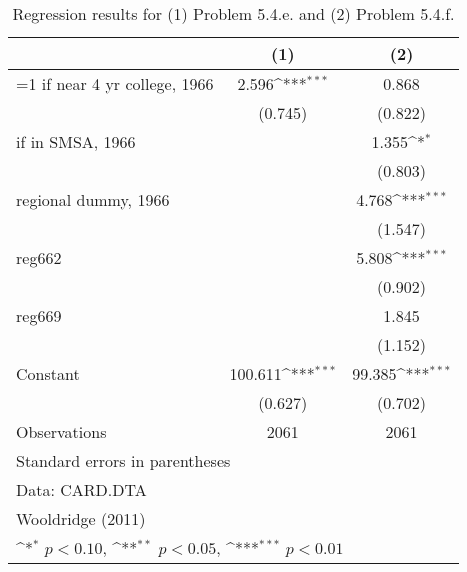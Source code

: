 \begin{table}[htbp]\centering
\def\sym#1{\ifmmode^{#1}\else\(^{#1}\)\fi}
\caption{Regression results for (1) Problem 5.4.e. and (2) Problem 5.4.f.}
\begin{tabular}{l*{2}{c}}
\toprule
                    &\multicolumn{1}{c}{(1)}         &\multicolumn{1}{c}{(2)}         \\
\midrule
=1 if near 4 yr college, 1966&       2.596\sym{***}&       0.868         \\
                    &     (0.745)         &     (0.822)         \\
\addlinespace
=1 if in SMSA, 1966 &                     &       1.355\sym{*}  \\
                    &                     &     (0.803)         \\
\addlinespace
regional dummy, 1966&                     &       4.768\sym{***}\\
                    &                     &     (1.547)         \\
\addlinespace
reg662              &                     &       5.808\sym{***}\\
                    &                     &     (0.902)         \\
\addlinespace
reg669              &                     &       1.845         \\
                    &                     &     (1.152)         \\
\addlinespace
Constant            &     100.611\sym{***}&      99.385\sym{***}\\
                    &     (0.627)         &     (0.702)         \\
\midrule
Observations        &        2061         &        2061         \\
\bottomrule
\multicolumn{3}{l}{\footnotesize Standard errors in parentheses}\\
\multicolumn{3}{l}{\footnotesize Data: CARD.DTA}\\
\multicolumn{3}{l}{\footnotesize Wooldridge (2011)}\\
\multicolumn{3}{l}{\footnotesize \sym{*} \(p<0.10\), \sym{**} \(p<0.05\), \sym{***} \(p<0.01\)}\\
\end{tabular}
\end{table}
